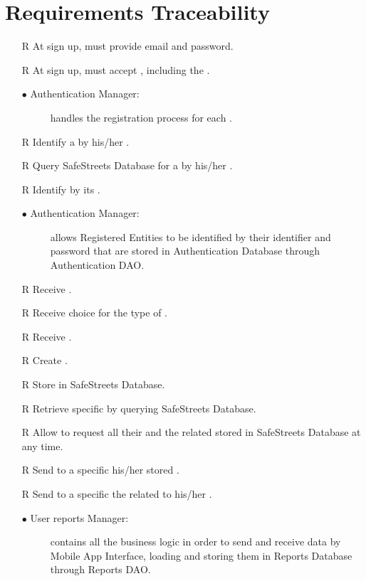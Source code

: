 \documentclass[../DD.tex]{subfiles}
\begin{document}
\chapter{Requirements Traceability}
\thispagestyle{fancy}



\begin{itemize}
	\item[R\subs{1}]At sign up,  must provide email and password.
	\item[R\subs{2}]At sign up,  must accept , including the .
	\begin{description}
	 \item[$\bullet$ Authentication Manager:] handles the registration process for each .
	\end{description}

	\item[R\subs{3}]Identify a  by his/her .
	\item[R\subs{13}]Query SafeStreets Database for a  by his/her .
	\item[R\subs{29}]Identify  by its .
	\begin{description}
	\item[$\bullet$ Authentication Manager:] allows Registered Entities to be identified by their identifier and password that are stored in Authentication Database through Authentication DAO.
	\end{description}

	\item[R\subs{4}]Receive .
	\item[R\subs{5}]Receive  choice for the type of .
	\item[R\subs{6}]Receive .
	\item[R\subs{9}]Create .
	\item[R\subs{10}]Store  in SafeStreets Database.
	\item[R\subs{14}]Retrieve specific  by querying SafeStreets Database.
	\item[R\subs{20}]Allow  to request all their  and the related  stored in SafeStreets Database at any time.
	\item[R\subs{21}]Send to a specific  his/her stored .
	\item[R\subs{22}]Send to a specific  the  related to his/her .
	\begin{description}
	\item[$\bullet$ User reports Manager:] contains all the business logic in order to send and receive  data by Mobile App Interface, loading and storing them in Reports Database through Reports DAO.
	\end{description}


\end{itemize}
\end{document}
